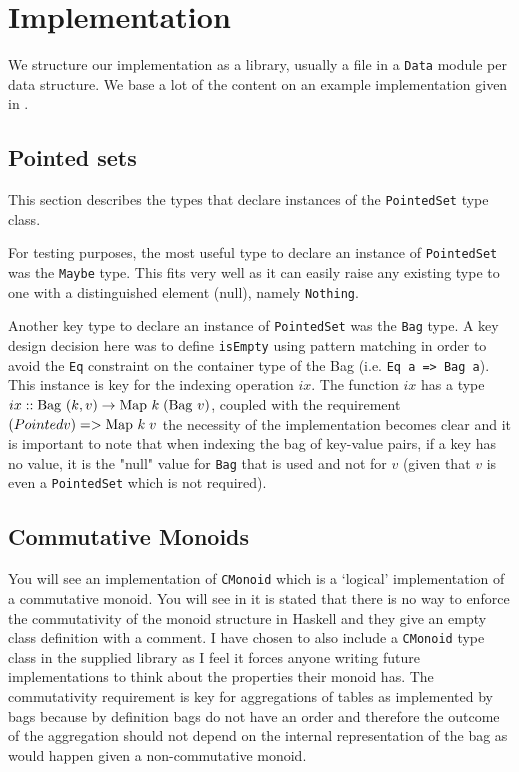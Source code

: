 \section{Implementation}
We structure our implementation as a library, usually a file in a \texttt{Data}
module per data structure. We base a lot of the content on an example
implementation given in
\cite{RelationalAlgebraByWayOfAdjunctionsPrototypeImplementation}.

\subsection{Pointed sets}
This section describes the types that declare instances of the
\texttt{PointedSet} type class.

For testing purposes, the most useful type to declare an instance of
\texttt{PointedSet} was the \texttt{Maybe} type. This fits very well as it can
easily raise any existing type to one with a distinguished element (null),
namely \texttt{Nothing}.

Another key type to declare an instance of \texttt{PointedSet} was the
\texttt{Bag} type. A key design decision here was to define \texttt{isEmpty}
using pattern matching in order to avoid the \texttt{Eq} constraint on the
container type of the Bag (i.e. \texttt{Eq a => Bag a}). This instance is key
for the indexing operation $ix$. The function $ix$ has a type $ix ::
\mathrm{Bag}\ (k, v) \to \mathrm{Map}\ k\;(\mathrm{Bag}\ v)$, coupled with the requirement $(Pointed v)
=> \mathrm{Map}\ k\;v$ the necessity of the implementation becomes clear and it is
important to note that when indexing the bag of key-value pairs, if a key has no
value, it is the "null" value for \texttt{Bag} that is used and not for $v$
(given that $v$ is even a \texttt{PointedSet} which is not required).

\subsection{Commutative Monoids}
You will see an implementation of \texttt{CMonoid} which is a `logical'
implementation of a commutative monoid. You will see in
\cite{RelationalAlgebraByWayOfAdjunctions} it is stated that there is no way to
enforce the commutativity of the monoid structure in Haskell and they give an
empty class definition with a comment. I have chosen to also include a
\texttt{CMonoid} type class in the supplied library as I feel it forces anyone
writing future implementations to think about the properties their monoid has.
The commutativity requirement is key for aggregations of tables as implemented
by bags because by definition bags do not have an order and therefore the
outcome of the aggregation should not depend on the internal representation of
the bag as would happen given a non-commutative monoid. 
